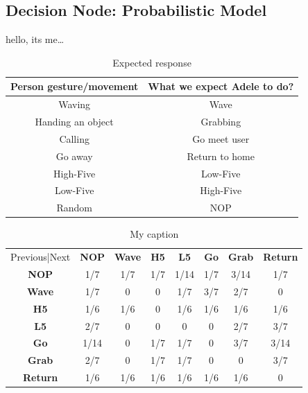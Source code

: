 \subsection{Decision Node: Probabilistic Model}
hello, its me\dots

\begin{table}[!h]
\centering
\label{tab:expected_response}
\begin{tabular}{|c|c|}
\hline
\textbf{Person gesture/movement} & \textbf{What we expect Adele to do?} \\ \hline
Waving                           & Wave                                 \\
Handing an object                & Grabbing                             \\
Calling                          & Go meet user                         \\
Go away                          & Return to home                       \\
High-Five                        & Low-Five                             \\
Low-Five                         & High-Five                            \\
Random                           & NOP                                  \\ \hline
\end{tabular}
\caption{Expected response}
\end{table}


\begin{table}[]
\centering
\begin{tabular}{cccccccc}
Previous|Next                        & \textbf{NOP} & \textbf{Wave} & \textbf{H5} & \textbf{L5} & \textbf{Go} & \textbf{Grab} & \textbf{Return} \\ \cline{2-8} 
\multicolumn{1}{c|}{\textbf{NOP}}    & 1/7          & 1/7           & 1/7         & 1/14        & 1/7         & 3/14          & 1/7             \\
\multicolumn{1}{c|}{\textbf{Wave}}   & 1/7          & 0             & 0           & 1/7         & 3/7         & 2/7           & 0               \\
\multicolumn{1}{c|}{\textbf{H5}}     & 1/6          & 1/6           & 0           & 1/6         & 1/6         & 1/6           & 1/6             \\
\multicolumn{1}{c|}{\textbf{L5}}     & 2/7          & 0             & 0           & 0           & 0           & 2/7           & 3/7             \\
\multicolumn{1}{c|}{\textbf{Go}}     & 1/14         & 0             & 1/7         & 1/7         & 0           & 3/7           & 3/14            \\
\multicolumn{1}{c|}{\textbf{Grab}}   & 2/7          & 0             & 1/7         & 1/7         & 0           & 0             & 3/7             \\
\multicolumn{1}{c|}{\textbf{Return}} & 1/6          & 1/6           & 1/6         & 1/6         & 1/6         & 1/6           & 0              
\end{tabular}
\caption{My caption}
\label{my-label}
\end{table}